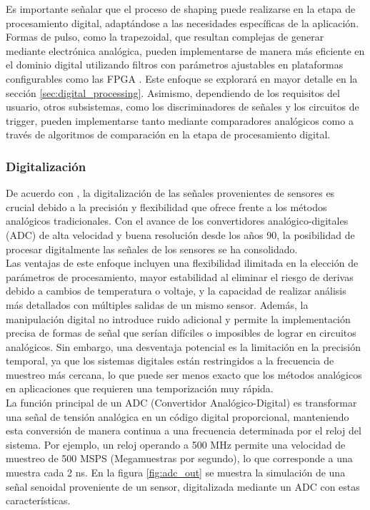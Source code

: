 \documentclass[]{book}
\begin{document}
\noindent Es importante señalar que el proceso de shaping puede realizarse en la etapa de procesamiento digital, adaptándose a las necesidades específicas de la aplicación. Formas de pulso, como la trapezoidal, que resultan complejas de generar mediante electrónica analógica, pueden implementarse de manera más eficiente en el dominio digital utilizando filtros con parámetros ajustables en plataformas configurables como las FPGA \cite{radeka1968optimum}. Este enfoque se explorará en mayor detalle en la sección \ref{sec:digital_processing}. Asimismo, dependiendo de los requisitos del usuario, otros subsistemas, como los discriminadores de señales y los circuitos de trigger, pueden implementarse tanto mediante comparadores analógicos como a través de algoritmos de comparación en la etapa de procesamiento digital.

\subsubsection{Digitalización}
\noindent De acuerdo con \cite{meyer2007digital}, la digitalización de las señales provenientes de sensores es crucial debido a la precisión y flexibilidad que ofrece frente a los métodos analógicos tradicionales. Con el avance de los convertidores analógico-digitales (ADC) de alta velocidad y buena resolución desde los años 90, la posibilidad de procesar digitalmente las señales de los sensores se ha consolidado.\\

\noindent Las ventajas de este enfoque incluyen una flexibilidad ilimitada en la elección de parámetros de procesamiento, mayor estabilidad al eliminar el riesgo de derivas debido a cambios de temperatura o voltaje, y la capacidad de realizar análisis más detallados con múltiples salidas de un mismo sensor. Además, la manipulación digital no introduce ruido adicional y permite la implementación precisa de formas de señal que serían difíciles o imposibles de lograr en circuitos analógicos. Sin embargo, una desventaja potencial es la limitación en la precisión temporal, ya que los sistemas digitales están restringidos a la frecuencia de muestreo más cercana, lo que puede ser menos exacto que los métodos analógicos en aplicaciones que requieren una temporización muy rápida.\\

\noindent La función principal de un ADC (Convertidor Analógico-Digital) es transformar una señal de tensión analógica en un código digital proporcional, manteniendo esta conversión de manera continua a una frecuencia determinada por el reloj del sistema. Por ejemplo, un reloj operando a 500 MHz permite una velocidad de muestreo de 500 MSPS (Megamuestras por segundo), lo que corresponde a una muestra cada 2 ns. En la figura \ref{fig:adc_out} se muestra la simulación de una señal senoidal proveniente de un sensor, digitalizada mediante un ADC con estas características.
\end{document}
